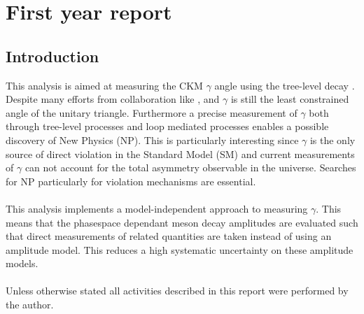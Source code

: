 \setcounter{chapter}{1}
\chapter*{First year report}
\section{Introduction}
This analysis is aimed at measuring the CKM $\gamma$ angle using the tree-level decay \BToDK.\\
Despite many efforts from collaboration like \babar, \belle and \lhcb $\gamma$ is still the least constrained angle of the unitary triangle. Furthermore a precise measurement of $\gamma$ both through tree-level processes and loop mediated processes enables a possible discovery of New Physics (NP). This is particularly interesting since $\gamma$ is the only source of direct \CP violation in the Standard Model (SM) and current measurements of $\gamma$ can not account for the total \CP asymmetry observable in the universe. Searches for NP particularly for \CP violation mechanisms are essential.\\
\\
This analysis implements a model-independent approach to measuring $\gamma$. This means that the phasespace dependant \D meson decay amplitudes are evaluated such that direct measurements of related quantities are taken instead of using an amplitude model. This reduces a high systematic uncertainty on these amplitude models.\\
\\
Unless otherwise stated all activities described in this report were performed by the author.\\

